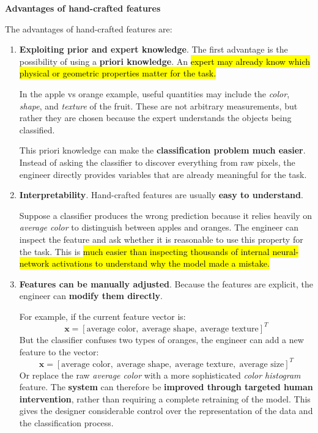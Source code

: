 \highspace
\begin{flushleft}
    \textcolor{Green3}{ \textbf{Advantages of hand-crafted features}}
\end{flushleft}
The advantages of hand-crafted features are:
\begin{enumerate}
    \item \textcolor{Green3}{\textbf{Exploiting prior and expert knowledge}}. The first advantage is the possibility of using a \textbf{priori knowledge}. An \hl{expert may already know which physical or geometric properties matter for the task.}
    
    \highspace
    In the apple vs orange example, useful quantities may include the \emph{color}, \emph{shape}, and \emph{texture} of the fruit. These are not arbitrary measurements, but rather they are chosen because the expert understands the objects being classified.

    \highspace
    This priori knowledge can make the \textbf{classification problem much easier}. Instead of asking the classifier to discover everything from raw pixels, the engineer directly provides variables that are already meaningful for the task.


    \item \textcolor{Green3}{\textbf{Interpretability}}. Hand-crafted features are usually \textbf{easy to understand}.
    
    \highspace
    Suppose a classifier produces the wrong prediction because it relies heavily on \emph{average color} to distinguish between apples and oranges. The engineer can inspect the feature and ask whether it is reasonable to use this property for the task. This is \hl{much easier than inspecting thousands of internal neural-network activations to understand why the model made a mistake.}


    \item \textcolor{Green3}{\textbf{Features can be manually adjusted}}. Because the features are explicit, the engineer can \textbf{modify them directly}.
    
    \highspace
    For example, if the current feature vector is:
    \begin{equation*}
        \mathbf{x} = \left[
            \text{average color},\; \text{average shape},\; \text{average texture}
        \right]^{T}
    \end{equation*}
    But the classifier confuses two types of oranges, the engineer can add a new feature to the vector:
    \begin{equation*}
        \mathbf{x} = \left[
            \text{average color},\; \text{average shape},\; \text{average texture},\; \text{average size}
        \right]^{T}
    \end{equation*}
    Or replace the raw \emph{average color} with a more sophisticated \emph{color histogram} feature. The \textbf{system} can therefore be \textbf{improved through targeted human intervention}, rather than requiring a complete retraining of the model. This gives the designer considerable control over the representation of the data and the classification process.


\end{enumerate}
